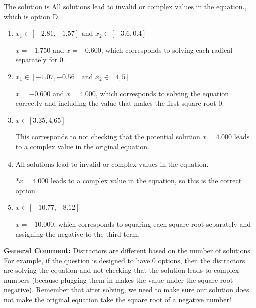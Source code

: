 \documentclass{extbook}[14pt]
\begin{document}
\begin{enumerate}
{The solution is \( \text{All solutions lead to invalid or complex values in the equation.} \), which is option D.\begin{enumerate}[label=\Alph*.]
\item \( x_1 \in [-2.81, -1.57] \text{ and } x_2 \in [-3.6,0.4] \)

$x = -1.750$ and $x = -0.600$, which corresponds to solving each radical separately for 0.
\item \( x_1 \in [-1.07, -0.56] \text{ and } x_2 \in [4,5] \)

$x = -0.600$ and $x = 4.000$, which corresponds to solving the equation correctly and including the value that makes the first square root 0.
\item \( x \in [3.35,4.65] \)

This corresponds to not checking that the potential solution $x = 4.000$ leads to a complex value in the original equation.
\item \( \text{All solutions lead to invalid or complex values in the equation.} \)

*$x = 4.000$ leads to a complex value in the equation, so this is the correct option.
\item \( x \in [-10.77,-8.12] \)

$x = -10.000$, which corresponds to squaring each square root separately and assigning the negative to the third term.
\end{enumerate}

\textbf{General Comment:} Distractors are different based on the number of solutions. For example, if the question is designed to have 0 options, then the distractors are solving the equation and not checking that the solution leads to complex numbers (because plugging them in makes the value under the square root negative). Remember that after solving, we need to make sure our solution does not make the original equation take the square root of a negative number!
}
\end{enumerate}
\end{document}
